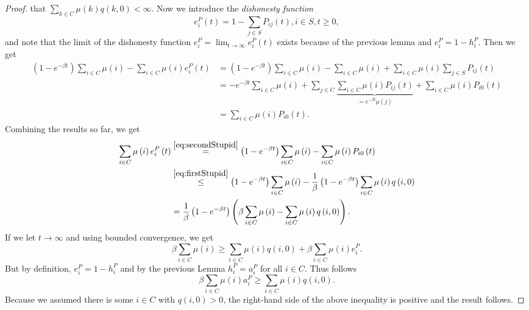 \documentclass[12pt,a4paper]{scrartcl}
\numberwithin{equation}{section}
\begin{document}
\begin{proof}
that $\sum_{k \in C} \mu\left(k\right) q\left(k,0\right) < \infty $. Now we introduce the \emph{dishonesty function}
$$ e_i^P \left(t\right) = 1 - \sum_{j \in S} P_{ij}\left(t\right), i \in S, t\geq 0, $$
and note that the limit of the dishonesty function $e_i^P = \lim_{t \to \infty} e_i^P\left(t\right) $ exists because of the previous lemma and $e_i^P = 1- h_i^P$. Then we get
\begin{equation} \label{eq:secondStupid}
\begin{aligned}
\left(1 - e^{-\beta t}\right) \sum_{i \in C} \mu\left(i\right) - \sum_{i \in C} \mu\left(i\right) e_i^P\left(t\right) &= \left(1 - e^{-\beta t} \right) \sum_{i \in C} \mu\left(i\right) - \sum_{i \in C} \mu\left(i\right) + \sum_{i \in C} \mu\left(i\right) \sum_{j \in S}P_{ij}\left(t\right) \\
&= - e^{-\beta t} \sum_{i \in C}\mu\left(i\right) + \sum_{j \in C} \underbrace{\sum_{i \in C} \mu\left(i\right) P_{ij}\left(t\right)}_{= e^{-\beta t} \mu\left(j\right)} + \sum_{i \in C} \mu\left(i\right) P_{i0}\left(t\right) \\
&= \sum_{i \in C} \mu\left(i\right) P_{i0}\left(t\right).
\end{aligned}
\end{equation}
Combining the results so far, we get
\begin{align*}
\sum_{i \in C}\mu\left(i\right) e_i^P\left(t\right) &\overset{\eqref{eq:secondStupid}} {=} \left(1 - e^{-\beta t} \right) \sum_{i \in C} \mu\left(i\right) - \sum_{i \in C} \mu\left(i\right) P_{i0}\left(t\right) \\
&\overset{\eqref{eq:firstStupid}}{\leq} \left(1 - e^{-\beta t} \right) \sum_{i \in C} \mu\left(i\right) - \frac{1}{\beta} \left(1 - e^{- \beta t} \right) \sum_{i \in C} \mu\left(i\right) q\left(i,0\right) \\
&= \frac{1}{\beta} \left(1 - e^{-\beta t} \right) \left( \beta \sum_{i \in C} \mu\left(i\right)  - \sum_{i \in C} \mu\left(i\right) q\left(i,0\right) \right).
\end{align*}
If we let $t \to \infty$ and using bounded convergence, we get
$$ \beta \sum_{i \in C} \mu\left(i\right) \geq \sum_{i \in C}\mu\left(i\right) q\left(i,0\right) + \beta \sum_{i \in C} \mu\left(i\right) e_i^P.$$
But by definition, $e_i^P = 1- h_i^P$ and by the previous Lemma $h_i^P = a_i^P$ for all $i \in C.$ Thus follows
$$ \beta \sum_{i \in C} \mu\left(i\right) a_i^P \geq \sum_{i \in C}\mu\left(i\right) q\left(i,0\right). $$
Because we assumed there is some $i \in C$ with $q\left(i,0\right) > 0$, the right-hand side of the above inequality is positive and the result follows.

\end{proof}
\end{document}
